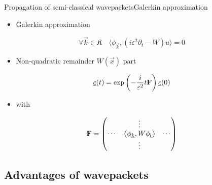 \documentclass{beamer}
\begin{document}
\begin{frame}{Propagation of semi-classical wavepackets}{Galerkin approximation}
  \begin{itemize}
  \item Galerkin approximation
  \end{itemize}
  \begin{equation*}
    \forall \vec{k} \in \mathfrak{K} \quad \langle \phi_{\vec{k}}, (i\varepsilon^2\partial_t -W) u \rangle = 0
  \end{equation*}
  \begin{itemize}
  \item Non-quadratic remainder $W(\vec{x})$ part
  \end{itemize}
  \begin{equation*}
    \underline{c}(t) = \exp\left(-\frac{i}{\varepsilon^2} t \mathbf{F}\right) \underline{c}(0)
  \end{equation*}
  \begin{itemize}
  \item with
  \end{itemize}
  \begin{equation*}
    \mathbf{F} =
    \begin{pmatrix}
      {}     & \vdots                                  & {} \\
      \cdots & \left\langle \phi_{\underline{k}} , W \phi_{\underline{l}} \right\rangle & \cdots \\
      {}     & \vdots                                  & {}
    \end{pmatrix}
  \end{equation*}
\end{frame}


\subsection{Advantages of wavepackets}
\end{document}
